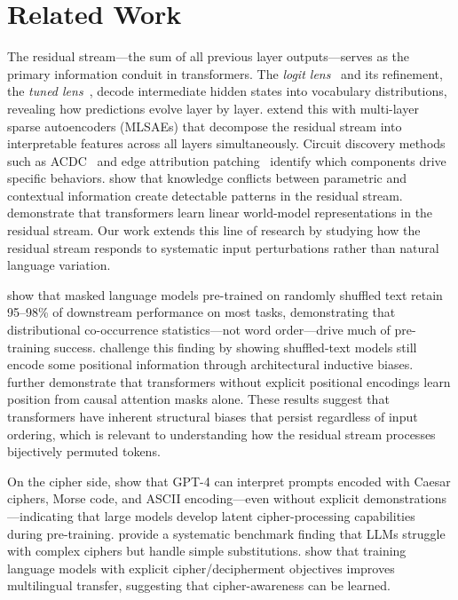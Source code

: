 \section{Related Work}
\label{sec:related}

The residual stream---the sum of all previous layer outputs---serves as the primary information conduit in transformers. The \emph{logit lens}~\citep{nostalgebraist2020logitlens} and its refinement, the \emph{tuned lens}~\citep{belrose2023tuned}, decode intermediate hidden states into vocabulary distributions, revealing how predictions evolve layer by layer. \citet{lawson2025mlsae} extend this with multi-layer sparse autoencoders (MLSAEs) that decompose the residual stream into interpretable features across all layers simultaneously.
Circuit discovery methods such as ACDC~\citep{conmy2023automated} and edge attribution patching~\citep{syed2023attribution} identify which components drive specific behaviors. \citet{zhao2024residual} show that knowledge conflicts between parametric and contextual information create detectable patterns in the residual stream. \citet{nanda2023emergent} demonstrate that transformers learn linear world-model representations in the residual stream. Our work extends this line of research by studying how the residual stream responds to systematic input perturbations rather than natural language variation.

\citet{sinha2021masked} show that masked language models pre-trained on randomly shuffled text retain 95--98\% of downstream performance on most tasks, demonstrating that distributional co-occurrence statistics---not word order---drive much of pre-training success. \citet{ravishankar2022word} challenge this finding by showing shuffled-text models still encode some positional information through architectural inductive biases. \citet{haviv2022positional} further demonstrate that transformers without explicit positional encodings learn position from causal attention masks alone. These results suggest that transformers have inherent structural biases that persist regardless of input ordering, which is relevant to understanding how the residual stream processes bijectively permuted tokens.

On the cipher side, \citet{yuan2023gpt4cipher} show that GPT-4 can interpret prompts encoded with Caesar ciphers, Morse code, and ASCII encoding---even without explicit demonstrations---indicating that large models develop latent cipher-processing capabilities during pre-training. \citet{li2025cipherbank} provide a systematic benchmark finding that LLMs struggle with complex ciphers but handle simple substitutions. \citet{lee2024decipherment} show that training language models with explicit cipher/decipherment objectives improves multilingual transfer, suggesting that cipher-awareness can be learned.

